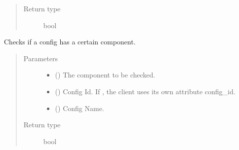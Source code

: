 \documentclass[letterpaper,10pt,english,openany,oneside]{sphinxmanual}
\begin{document}
\begin{fulllineitems}
\begin{fulllineitems}
\begin{quote}
\begin{description}
\item[{Return type}] \leavevmode
bool

\end{description}\end{quote}

\end{fulllineitems}


\begin{fulllineitems}
\label{\detokenize{_modules/AconitySTUDIO_client:AconitySTUDIO_client.AconitySTUDIO_client.config_has_component}}
Checks if a config has a certain component.
\begin{quote}\begin{description}
\item[{Parameters}] \leavevmode\begin{itemize}
\item {} 
 () \textendash{} The component to be checked.

\item {} 
 () \textendash{} Config Id. If , the client uses its own attribute config\_id.

\item {} 
 () \textendash{} Config Name.

\end{itemize}

\item[{Return type}] \leavevmode
bool

\end{description}\end{quote}

\end{fulllineitems}



\end{fulllineitems}
\end{document}
